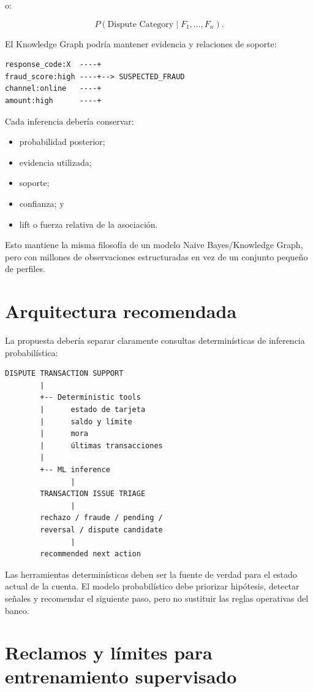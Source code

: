 \documentclass[11pt,a4paper]{article}
\begin{document}
o:

\[
P(\text{Dispute Category}\mid F_1,\ldots,F_n).
\]

El Knowledge Graph podría mantener evidencia y relaciones de soporte:

\begin{lstlisting}
response_code:X  ----+
fraud_score:high ----+--> SUSPECTED_FRAUD
channel:online   ----+
amount:high      ----+
\end{lstlisting}

Cada inferencia debería conservar:

\begin{itemize}
  \item probabilidad posterior;
  \item evidencia utilizada;
  \item soporte;
  \item confianza; y
  \item lift o fuerza relativa de la asociación.
\end{itemize}

Esto mantiene la misma filosofía de un modelo Naive Bayes/Knowledge Graph, pero con millones de observaciones estructuradas en vez de un conjunto pequeño de perfiles.

\section{Arquitectura recomendada}

La propuesta debería separar claramente consultas determinísticas de inferencia probabilística:

\begin{lstlisting}
DISPUTE TRANSACTION SUPPORT
        |
        +-- Deterministic tools
        |      estado de tarjeta
        |      saldo y límite
        |      mora
        |      últimas transacciones
        |
        +-- ML inference
               |
        TRANSACTION ISSUE TRIAGE
               |
        rechazo / fraude / pending /
        reversal / dispute candidate
               |
        recommended next action
\end{lstlisting}

Las herramientas determinísticas deben ser la fuente de verdad para el estado actual de la cuenta. El modelo probabilístico debe priorizar hipótesis, detectar señales y recomendar el siguiente paso, pero no sustituir las reglas operativas del banco.

\section{Reclamos y límites para entrenamiento supervisado}
\end{document}

